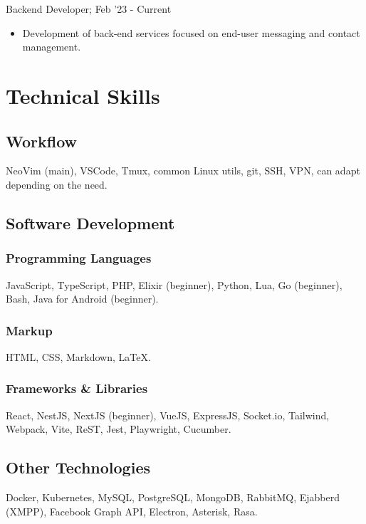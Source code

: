 \documentclass[letterpaper]{article}
\begin{document}
Backend Developer; Feb '23 - Current

\begin{itemize}
  \item Development of back-end services focused on end-user messaging and contact management.
\end{itemize}

\section{Technical Skills}

\subsection{Workflow}

NeoVim (main), VSCode, Tmux, common Linux utils, git, SSH, VPN, can adapt depending on the need.

\subsection{Software Development}

\subsubsection{Programming Languages}

JavaScript, TypeScript, PHP, Elixir (beginner), Python, Lua, Go (beginner), Bash, Java for Android (beginner).

\subsubsection{Markup}

HTML, CSS, Markdown, \LaTeX{}.

\subsubsection{Frameworks \& Libraries}

React, NestJS, NextJS (beginner), VueJS, ExpressJS, Socket.io, Tailwind, Webpack, Vite, ReST, Jest, Playwright, Cucumber.

\subsection{Other Technologies}

Docker, Kubernetes, MySQL, PostgreSQL, MongoDB, RabbitMQ, Ejabberd (XMPP), Facebook Graph API, Electron, Asterisk, Rasa.
\end{document}
